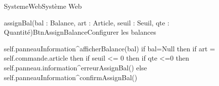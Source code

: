\begin{OM}{SystemeWeb}{Système Web}
    \begin{OMOperation}{assignBal(bal : Balance, art : Article, seuil : Seuil, qte : Quantité)}{BtnAssignBalance}{Configurer les balances}
        \begin{OMMessages}
        \end{OMMessages}
        \OMNoPre
        \begin{OMPost}
            self.panneauInformation^afficherBalance(bal)
            if bal=Null then
            if art = self.commande.article then
            if seuil <= 0 then
            if qte <=0 then
            self.panneau.information^erreurAssignBal()
            else
            self.panneauInformation^confirmAssignBal()
        \end{OMPost}
    \end{OMOperation}
\end{OM}
